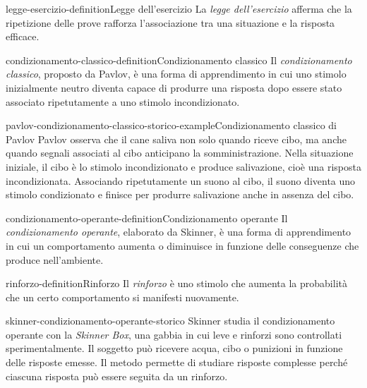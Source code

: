 \documentclass[preview]{standalone}
\begin{document}
\begin{snippetdefinition}{legge-esercizio-definition}{Legge dell'esercizio}
    La \emph{legge dell'esercizio} afferma che la ripetizione delle prove
    rafforza l'associazione tra una situazione e la risposta efficace.
\end{snippetdefinition}

\begin{snippetdefinition}{condizionamento-classico-definition}{Condizionamento classico}
    Il \emph{condizionamento classico}, proposto da Pavlov, è una forma di
    apprendimento in cui uno stimolo inizialmente neutro diventa capace di
    produrre una risposta dopo essere stato associato ripetutamente a uno
    stimolo incondizionato.
\end{snippetdefinition}

\begin{snippetexample}{pavlov-condizionamento-classico-storico-example}{Condizionamento classico di Pavlov}
    Pavlov osserva che il cane saliva non solo quando riceve cibo, ma anche
    quando segnali associati al cibo anticipano la somministrazione. Nella
    situazione iniziale, il cibo è lo stimolo incondizionato e produce
    salivazione, cioè una risposta incondizionata. Associando ripetutamente un
    suono al cibo, il suono diventa uno stimolo condizionato e finisce per
    produrre salivazione anche in assenza del cibo.
\end{snippetexample}


\begin{snippetdefinition}{condizionamento-operante-definition}{Condizionamento operante}
    Il \emph{condizionamento operante}, elaborato da Skinner, è una forma di
    apprendimento in cui un comportamento aumenta o diminuisce in funzione
    delle conseguenze che produce nell'ambiente.
\end{snippetdefinition}

\begin{snippetdefinition}{rinforzo-definition}{Rinforzo}
    Il \emph{rinforzo} è uno stimolo che aumenta la probabilità che un certo
    comportamento si manifesti nuovamente.
\end{snippetdefinition}

\begin{snippet}{skinner-condizionamento-operante-storico}
    Skinner studia il condizionamento operante con la \emph{Skinner Box}, una
    gabbia in cui leve e rinforzi sono controllati sperimentalmente. Il
    soggetto può ricevere acqua, cibo o punizioni in funzione delle risposte
    emesse. Il metodo permette di studiare risposte complesse perché ciascuna
    risposta può essere seguita da un rinforzo.
\end{snippet}
\end{document}
